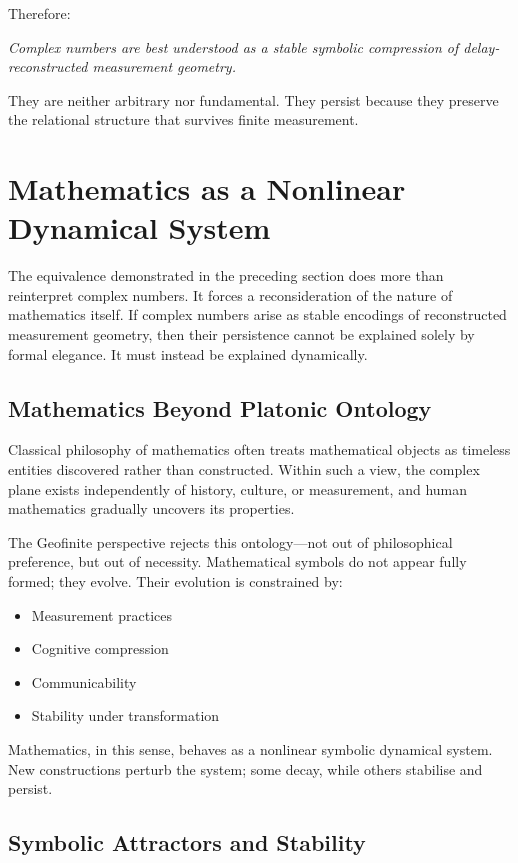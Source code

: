 \documentclass[12pt]{book}  %
\begin{document}
Therefore:

\textit{Complex numbers are best understood as a stable symbolic compression of delay-reconstructed measurement geometry.}

They are neither arbitrary nor fundamental. They persist because they preserve the relational structure that survives finite measurement.

\chapter{Mathematics as a Nonlinear Dynamical System}

The equivalence demonstrated in the preceding section does more than reinterpret complex numbers. It forces a reconsideration of the nature of mathematics itself. If complex numbers arise as stable encodings of reconstructed measurement geometry, then their persistence cannot be explained solely by formal elegance. It must instead be explained dynamically.

\section*{Mathematics Beyond Platonic Ontology}

Classical philosophy of mathematics often treats mathematical objects as timeless entities discovered rather than constructed. Within such a view, the complex plane exists independently of history, culture, or measurement, and human mathematics gradually uncovers its properties.

The Geofinite perspective rejects this ontology—not out of philosophical preference, but out of necessity. Mathematical symbols do not appear fully formed; they evolve. Their evolution is constrained by:

\begin{itemize}
    \item Measurement practices
    \item Cognitive compression
    \item Communicability
    \item Stability under transformation
\end{itemize}

Mathematics, in this sense, behaves as a nonlinear symbolic dynamical system. New constructions perturb the system; some decay, while others stabilise and persist.

\section*{Symbolic Attractors and Stability}
\end{document}
